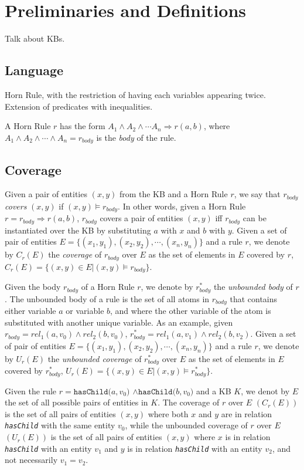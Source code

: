 \section{Preliminaries and Definitions}
{\color{red} Talk about KBs.}

\subsection{Language}
{\color{red} Horn Rule, with the restriction of having each variables appearing twice.
Extension of predicates with inequalities.}

A Horn Rule $r$ has the form $A_1 \wedge A_2 \wedge \cdots A_n \Rightarrow r(a,b)$, where  $A_1 \wedge A_2 \wedge \cdots \wedge A_n = r_{body}$ is the \emph{body} of the rule.

\subsection{Coverage}
Given a pair of entities $(x,y)$ from the KB and a Horn Rule $r$, we say that $r_{body}$ \emph{covers} $(x,y)$ if
$(x,y) \models r_{body}$. In other words, given a Horn Rule $r = r_{body} \Rightarrow r(a,b)$, $r_{body}$ covers a pair of entities $(x,y)$ iff $r_{body}$ can be instantiated over the KB by substituting $a$ with $x$ and $b$ with $y$. Given a set of pair of entities $E = \{(x_1,y_1),(x_2,y_2),\cdots,(x_n,y_n)\}$ and a rule $r$, we denote by $C_r(E)$ the \emph{coverage} of $r_{body}$ over $E$ as the set of elements in $E$ covered by $r$, $C_r(E)=\{(x,y) \in E | (x,y) \models r_{body}\}$.

Given the body $r_{body}$ of a Horn Rule $r$, we denote by $r^{*}_{body}$ the \emph{unbounded body} of $r$. The unbounded body of a rule is the set of all atoms in $r_{body}$ that contains either variable $a$ or variable $b$, and where the other variable of the atom is substituted with another unique variable. As an example, given $r_{body} = rel_1(a,v_0) \wedge rel_2(b,v_0)$, $r^{*}_{body} = rel_1(a,v_1) \wedge rel_2(b,v_2)$. Given a set of pair of entities $E = \{(x_1,y_1),(x_2,y_2),\cdots,(x_n,y_n)\}$ and a rule $r$, we denote by $U_r(E)$ the \emph{unbounded coverage} of $r^{*}_{body}$ over $E$ as the set of elements in $E$ covered by $r^{*}_{body}$, $U_r(E)=\{(x,y) \in E | (x,y) \models r^{*}_{body}\}$.

\begin{myExample}
	Given the rule \emph{$r=\texttt{hasChild(}a,v_0\texttt{)} $ $\wedge \texttt{hasChild(}b,v_0\texttt{)}$} and a KB $K$, we denot by $E$ the set of all possible pairs of entities in $K$.
	 The coverage of $r$ over $E$ $(C_r(E))$ is the set of all pairs of entities $(x,y)$ where both $x$ and $y$ are in relation \emph{\texttt{hasChild}} with the same entity $v_0$, while the unbounded coverage of $r$ over $E$ $(U_r(E))$ is the set of all pairs of entities $(x,y)$ where $x$ is in relation \emph{\texttt{hasChild}} with an entity $v_1$ and $y$ is in relation \emph{\texttt{hasChild}} with an entity $v_2$, and not necessarily $v_1 = v_2$. 
\end{myExample}

